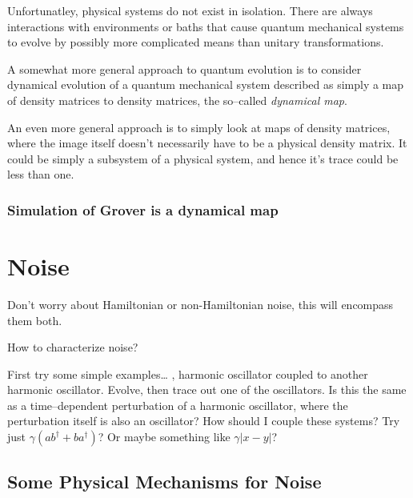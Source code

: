 Unfortunatley, physical systems do not exist in isolation.  There
are always interactions with environments or baths that cause
quantum mechanical systems to evolve by possibly more complicated
means than unitary transformations.

A somewhat more general approach to quantum evolution is to 
consider dynamical evolution of a quantum mechanical system
described as simply a map of density matrices to density
matrices, the so--called \emph{dynamical map}.

An even more general approach is to simply look at maps of
density matrices, where the image itself doesn't necessarily have to
be a physical density matrix.  It could be simply a subsystem
of a physical system, and hence it's trace could be less than
one.


\subsubsection{Simulation of Grover is a dynamical map}




\section{Noise}

Don't worry about Hamiltonian or non-Hamiltonian noise, this will encompass
them both.

How to characterize noise?

First try some simple examples\dots
\ie, harmonic oscillator coupled to another harmonic oscillator.
Evolve, then trace out one of the oscillators.  Is this the same as
a time--dependent perturbation of a harmonic oscillator, where the
perturbation itself is also an oscillator?  How should I couple these
systems?  Try just $\gamma\left( a b^\dagger + b a^\dagger\right)$?
Or maybe something like $\gamma\left| x-y\right|$?


\subsection{Some Physical Mechanisms for Noise}


